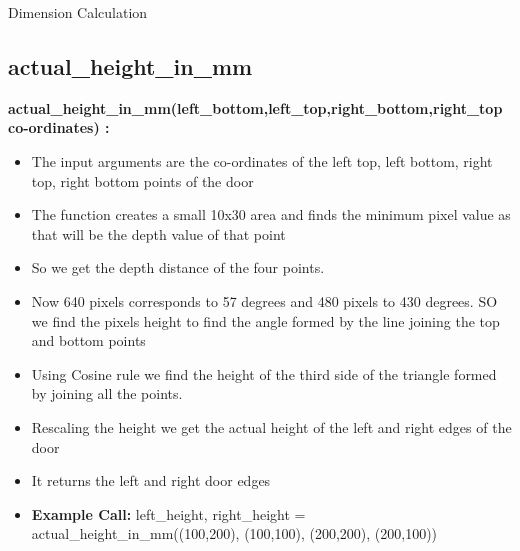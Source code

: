 \documentclass[10pt, a4paper]{beamer}
\begin{document}
\begin{frame}[allowframebreaks]{Dimension Calculation}
  \subsection{actual\_height\_in\_mm}
    \textbf{actual\_height\_in\_mm(left\_bottom,left\_top,right\_bottom,right\_top co-ordinates) : }
      \begin{itemize}
       \item The input arguments are the co-ordinates of the left top, left bottom, right top, right bottom points of the door
       \item The function creates a small 10x30 area and finds the minimum pixel value as that will be the depth value of that point
       \item So we get the depth distance of the four points.
       \item Now 640 pixels corresponds to 57 degrees and 480 pixels to 430 degrees. SO we find the pixels height to find the angle formed by the line joining the top and bottom points
       \item Using Cosine rule we find the height of the third side of the triangle formed by joining all the points.
       \item Rescaling the height we get the actual height of the left and right edges of the door
       \item It returns the left and right door edges
       \item \textbf{Example Call:} left\_height, right\_height = actual\_height\_in\_mm((100,200), (100,100), (200,200), (200,100))
      \end{itemize}
  \framebreak

\end{frame}
\end{document}
